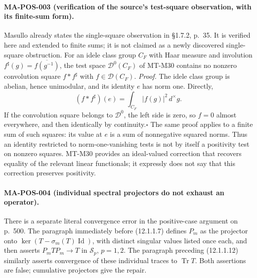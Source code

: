 \paragraph{MA-POS-003 (verification of the source's test-square observation, with its finite-sum form).}
Masullo already states the single-square observation in
\S1.7.2, p.~35. It is verified here and extended to finite
sums; it is not claimed as a newly discovered single-square
obstruction.
For an idele class group $C_F$ with Haar measure and involution
$f^\sharp(g)=\overline{f(g^{-1})}$, the test space
$\mathcal D^0(C_F)$ of MT-M30 contains no nonzero convolution
square $f*f^\sharp$ with $f\in\mathcal D(C_F)$.
\emph{Proof.} The idele class group is abelian, hence unimodular,
and its identity $e$ has norm one. Directly,
\[
 (f*f^\sharp)(e)=\int_{C_F}|f(g)|^2\,d^\times g.
\]
If the convolution square belongs to $\mathcal D^0$, the left
side is zero, so $f=0$ almost everywhere, and then identically
by continuity.\hfill$\square$
The same proof applies to a finite sum of such squares: its
value at $e$ is a sum of nonnegative squared norms. Thus an
identity restricted to norm-one-vanishing tests is not by itself
a positivity test on nonzero squares. MT-M30 provides an
ideal-valued correction that recovers equality of the relevant
linear functionals; it expressly does not say that this
correction preserves positivity.

\paragraph{MA-POS-004 (individual spectral projectors do not exhaust an operator).}
There is a separate literal convergence error in the positive-case
argument on p.~500. The paragraph immediately before (12.1.1.7)
defines $P_m$ as the projector onto
$\ker(T-\sigma_m(T)\operatorname{Id})$, with distinct singular
values listed once each, and then asserts
$P_mTP_m\to T$ in $\mathcal S_p$, $p=1,2$.
The paragraph preceding (12.1.1.12) similarly asserts convergence
of these individual traces to $\operatorname{Tr}T$.
Both assertions are false; cumulative projectors give the repair.

